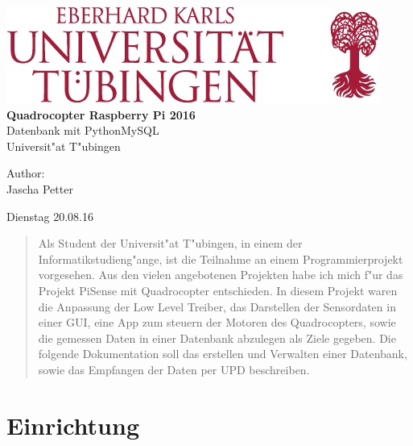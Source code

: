 \documentclass[oneside, a4paper, 11pt]{report}
\author{Jascha Petter}
\begin{document}
	\begin{titlepage}
		\begin{center}
			\includegraphics[width=0.4\linewidth]{img/image2.jpg}\\
			\vspace*{3.5cm}
			\Huge{\bf Quadrocopter Raspberry Pi 2016\bigskip\bigskip\\}
			\LARGE{Datenbank mit PythonMySQL\bigskip\bigskip\\}
			\large{Universit"at T"ubingen\vfill}
		\end{center}
		\vspace*{1cm}
		\begin{minipage}{\widthof{Jascha Petter}}
			\begin{flushleft}
				Author:\\
				Jascha Petter
			\end{flushleft}
		\end{minipage}
		\hfill
		\begin{minipage}{\widthof{\today}}
			\begin{flushright}
				Dienstag 20.08.16
			\end{flushright}
		\end{minipage}
	\end{titlepage}
	\begin{abstract}	
		Als Student der Universit"at T"ubingen, in einem der Informatikstudieng"ange, ist die Teilnahme an einem Programmierprojekt vorgesehen. Aus den vielen angebotenen Projekten habe ich mich f"ur das Projekt \glqq{}PiSense mit Quadrocopter\grqq{} entschieden. In diesem Projekt waren die Anpassung der Low Level Treiber, das Darstellen der Sensordaten in einer GUI, eine App zum steuern der Motoren des Quadrocopters, sowie die gemessen Daten in einer Datenbank abzulegen als Ziele gegeben. Die folgende Dokumentation soll das erstellen und Verwalten einer Datenbank, sowie das Empfangen der Daten per UPD beschreiben. 
	\end{abstract}
	\newpage
	\begingroup
	\let\clearpage\relax
	\tableofcontents
	\listoffigures
	\endgroup
	\newpage
	\chapter{Einrichtung}
\end{document}
